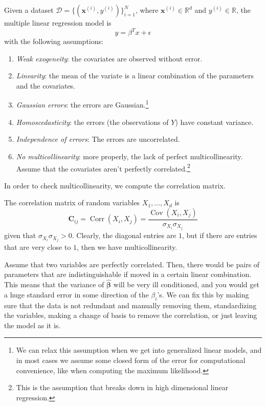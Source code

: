 \documentclass{article}
\DeclareMathOperator{\Cov}{Cov}
\DeclareMathOperator{\Corr}{Corr}
\begin{document}
    \begin{definition}
      Given a dataset $\mathcal{D} = \{(\mathbf{x}^{(i)}, y^{(i)})\}_{i=1}^N$, where $\mathbf{x}^{(i)} \in \mathbb{R}^d$ and $y^{(i)} \in \mathbb{R}$, the multiple linear regression model is 
      \begin{equation}
        y = \beta^T x + \epsilon
      \end{equation}
      with the following assumptions: 
      \begin{enumerate}
        \item \textit{Weak exogeneity}: the covariates are observed without error.
        \item \textit{Linearity}: the mean of the variate is a linear combination of the parameters and the covariates.
        \item \textit{Gaussian errors}: the errors are Gaussian.\footnote{We can relax this assumption when we get into generalized linear models, and in most cases we assume some closed form of the error for computational convenience, like when computing the maximum likelihood.}
        \item \textit{Homoscedasticity}: the errors (the observations of $Y$) have constant variance. 
        \item \textit{Independence of errors}: The errors are uncorrelated.
        \item \textit{No multicollinearity}: more properly, the lack of perfect multicollinearity. Assume that the covariates aren't perfectly correlated.\footnote{This is the assumption that breaks down in high dimensional linear regression.} 
      \end{enumerate}
    \end{definition}

    In order to check multicollinearity, we compute the correlation matrix. 

    \begin{definition}
      The correlation matrix of random variables $X_1, \ldots, X_d$ is 
      \[\mathbf{C}_{ij} = \Corr(X_i, X_j) = \frac{\Cov(X_i, X_j)}{\sigma_{X_i} \sigma_{X_j}}\]
      given that $\sigma_{X_i} \sigma_{X_j} > 0$. Clearly, the diagonal entries are $1$, but if there are entries that are very close to $1$, then we have multicollinearity. 
    \end{definition}

    Assume that two variables are perfectly correlated. Then, there would be pairs of parameters that are indistinguishable if moved in a certain linear combination. This means that the variance of $\hat{\boldsymbol{\beta}}$ will be very ill conditioned, and you would get a huge standard error in some direction of the $\beta_i$'s. We can fix this by making sure that the data is not redundant and manually removing them, standardizing the variables, making a change of basis to remove the correlation, or just leaving the model as it is. 
\end{document}
